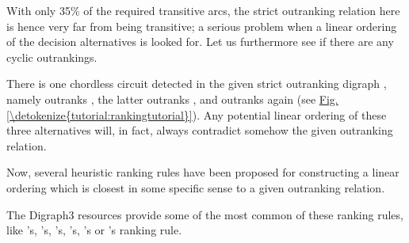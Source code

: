 \documentclass[a4paper,12pt,english]{sphinxhowto}
\begin{document}
\begin{sphinxVerbatim}[commandchars=\\\{\}]
\end{sphinxVerbatim}

With only 35\% of the required transitive arcs, the strict outranking relation here is hence very far from being transitive; a serious problem when a linear ordering of the decision alternatives is looked for. Let us furthermore see if there are any cyclic outrankings.

\begin{sphinxVerbatim}[commandchars=\\\{\},numbers=left,firstnumber=1,stepnumber=1]
\end{sphinxVerbatim}

There is one chordless circuit detected in the given strict outranking digraph , namely  outranks , the latter outranks , and  outranks again  (see \hyperref[\detokenize{tutorial:rankingtutorial}]{Fig.\@ \ref{\detokenize{tutorial:rankingtutorial}}}). Any potential linear ordering of these three alternatives will, in fact, always contradict somehow the given outranking relation.

Now, several heuristic ranking rules have been proposed for constructing a linear ordering which is closest in some specific sense to a given outranking relation.

The Digraph3 resources provide some of the most common of these ranking rules, like ’s, ’s, ’s, ’s, ’s or ’s ranking rule.
\end{document}
